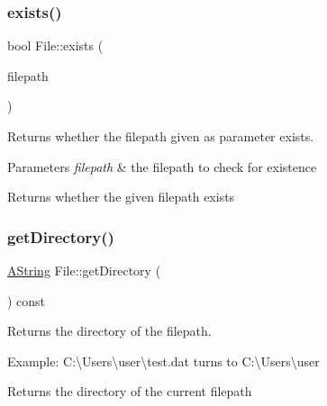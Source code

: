 \subsubsection{\texorpdfstring{exists()}{exists()}\hspace{0.1cm}{\footnotesize\ttfamily [2/2]}}
{\footnotesize\ttfamily bool File\+::exists (\begin{DoxyParamCaption}\item[{const \mbox{\hyperlink{class_a_string}{A\+String}} \&}]{filepath }\end{DoxyParamCaption})\hspace{0.3cm}{\ttfamily [static]}}



Returns whether the filepath given as parameter exists. 


\begin{DoxyParams}{Parameters}
{\em filepath} & the filepath to check for existence \\
\hline
\end{DoxyParams}
\begin{DoxyReturn}{Returns}
whether the given filepath exists 
\end{DoxyReturn}
\mbox{\label{class_file_ac3770227bca4efa56a4d3a33fe83fa8e}} 
\subsubsection{\texorpdfstring{getDirectory()}{getDirectory()}}
{\footnotesize\ttfamily \mbox{\hyperlink{class_a_string}{A\+String}} File\+::get\+Directory (\begin{DoxyParamCaption}{ }\end{DoxyParamCaption}) const}



Returns the directory of the filepath. 

Example\+: C\+:\textbackslash{}Users\textbackslash{}user\textbackslash{}test.\+dat turns to C\+:\textbackslash{}Users\textbackslash{}user

\begin{DoxyReturn}{Returns}
the directory of the current filepath 
\end{DoxyReturn}
\mbox{\label{class_file_a953668209fb0f4c62093ae2c31475902}} 
